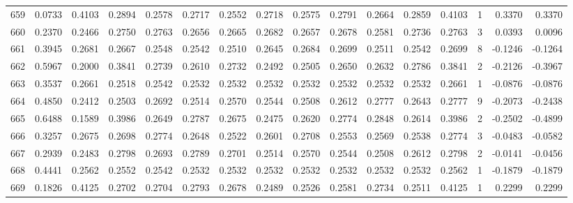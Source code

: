 \begin{tabular}{lrrrrrrrrrrrrrrr}
659 &      0.0733 &  0.4103 &  0.2894 &  0.2578 &  0.2717 &  0.2552 &  0.2718 &  0.2575 &  0.2791 &  0.2664 &   0.2859 &     0.4103 &      1 &                    0.3370 &                     0.3370 \\
660 &      0.2370 &  0.2466 &  0.2750 &  0.2763 &  0.2656 &  0.2665 &  0.2682 &  0.2657 &  0.2678 &  0.2581 &   0.2736 &     0.2763 &      3 &                    0.0393 &                     0.0096 \\
661 &      0.3945 &  0.2681 &  0.2667 &  0.2548 &  0.2542 &  0.2510 &  0.2645 &  0.2684 &  0.2699 &  0.2511 &   0.2542 &     0.2699 &      8 &                   -0.1246 &                    -0.1264 \\
662 &      0.5967 &  0.2000 &  0.3841 &  0.2739 &  0.2610 &  0.2732 &  0.2492 &  0.2505 &  0.2650 &  0.2632 &   0.2786 &     0.3841 &      2 &                   -0.2126 &                    -0.3967 \\
663 &      0.3537 &  0.2661 &  0.2518 &  0.2542 &  0.2532 &  0.2532 &  0.2532 &  0.2532 &  0.2532 &  0.2532 &   0.2532 &     0.2661 &      1 &                   -0.0876 &                    -0.0876 \\
664 &      0.4850 &  0.2412 &  0.2503 &  0.2692 &  0.2514 &  0.2570 &  0.2544 &  0.2508 &  0.2612 &  0.2777 &   0.2643 &     0.2777 &      9 &                   -0.2073 &                    -0.2438 \\
665 &      0.6488 &  0.1589 &  0.3986 &  0.2649 &  0.2787 &  0.2675 &  0.2475 &  0.2620 &  0.2774 &  0.2848 &   0.2614 &     0.3986 &      2 &                   -0.2502 &                    -0.4899 \\
666 &      0.3257 &  0.2675 &  0.2698 &  0.2774 &  0.2648 &  0.2522 &  0.2601 &  0.2708 &  0.2553 &  0.2569 &   0.2538 &     0.2774 &      3 &                   -0.0483 &                    -0.0582 \\
667 &      0.2939 &  0.2483 &  0.2798 &  0.2693 &  0.2789 &  0.2701 &  0.2514 &  0.2570 &  0.2544 &  0.2508 &   0.2612 &     0.2798 &      2 &                   -0.0141 &                    -0.0456 \\
668 &      0.4441 &  0.2562 &  0.2552 &  0.2542 &  0.2532 &  0.2532 &  0.2532 &  0.2532 &  0.2532 &  0.2532 &   0.2532 &     0.2562 &      1 &                   -0.1879 &                    -0.1879 \\
669 &      0.1826 &  0.4125 &  0.2702 &  0.2704 &  0.2793 &  0.2678 &  0.2489 &  0.2526 &  0.2581 &  0.2734 &   0.2511 &     0.4125 &      1 &                    0.2299 &                     0.2299 \\

\end{tabular}
